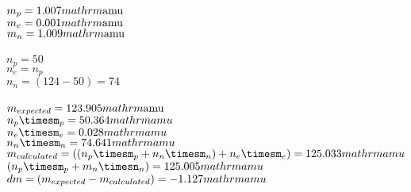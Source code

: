 \documentclass{article}
\begin{document}
$m_p=1.007\\mathrm{\mathrm{amu}}$\\
$m_e=0.001\\mathrm{\mathrm{amu}}$\\
$m_n=1.009\\mathrm{\mathrm{amu}}$\\
\\$n_p=50$\\
$n_e=n_p$\\
$n_n=(124-50)=74$\\
\\$m_{expected}=123.905\\mathrm{\mathrm{amu}}$\\
$n_p\timesm_p=50.364\\mathrm{amu}$\\
$n_e\timesm_e=0.028\\mathrm{amu}$\\
$n_n\timesm_n=74.641\\mathrm{amu}$\\
$m_{calculated}=((n_p\timesm_p+n_n\timesm_n)+n_e\timesm_e)=125.033\\mathrm{amu}$\\
$(n_p\timesm_p+m_n\timesn_n)=125.005\\mathrm{amu}$\\
$dm=(m_{expected}-m_{calculated})=-1.127\\mathrm{amu}$\\
\end{document}
